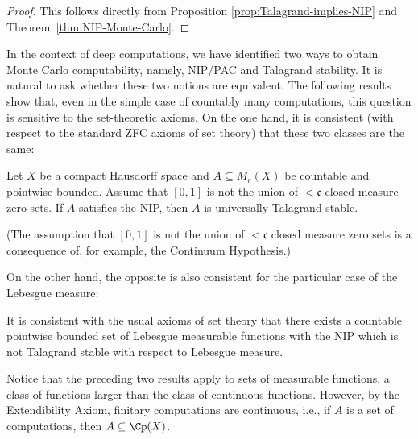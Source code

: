 \begin{proof}
    This follows directly from Proposition \ref{prop:Talagrand-implies-NIP} and Theorem~\ref{thm:NIP-Monte-Carlo}.
\end{proof}

In the context of deep computations, we have identified two ways to obtain Monte Carlo computability, namely, NIP/PAC and Talagrand stability.
It is natural to ask whether these two notions are equivalent. 
The following results show that, even in the simple case of countably many computations, this question is sensitive to the set-theoretic axioms. 
On the one hand, it is consistent (with respect to the standard ZFC axioms of set theory) that these two classes are the same:

\begin{theorem}\label{thm:NIP-implies-Talagrand-stab}
    Let $X$ be a compact Hausdorff space and $A\subseteq M_r(X)$ be countable and pointwise bounded.
    Assume that $[0,1]$ is not the union of $<\mathfrak{c}$ closed measure zero sets.
If $A$ satisfies the NIP, then $A$ is universally Talagrand stable.
\end{theorem}

(The assumption that $[0,1]$ is not the union of $<\mathfrak{c}$ closed measure zero sets is a consequence of, for example, the Continuum Hypothesis.)

On the other hand, the opposite is also consistent for the particular case of the Lebesgue measure:

\begin{theorem}
    It is consistent with the usual axioms of set theory that there exists a countable pointwise bounded set of Lebesgue measurable functions with the NIP which is not Talagrand stable with respect to Lebesgue measure.
\end{theorem}

Notice that the preceding two results apply to sets of measurable functions, a class of functions larger than the class of continuous functions.
However, by the Extendibility Axiom, finitary computations are continuous, i.e., if $A$ is a set of computations, then $A\subseteq \Cp(X)$.